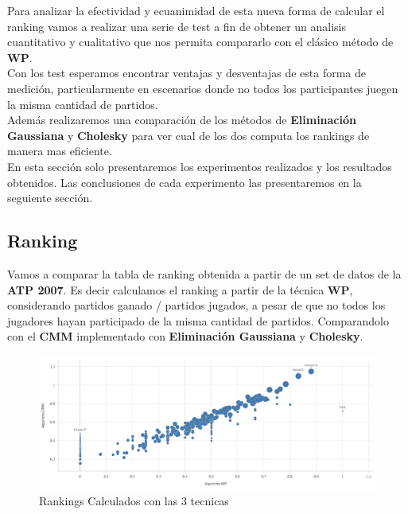 Para analizar la efectividad y ecuanimidad de esta nueva forma de calcular el ranking vamos a realizar una serie de test a fin de obtener un analisis cuantitativo y cualitativo que nos permita compararlo con el clásico método de \textbf{WP}. \\
Con los test esperamos encontrar ventajas y desventajas de esta forma de medición, particularmente en escenarios donde no todos los participantes juegen la misma cantidad de partidos.
\\

Además realizaremos una comparación de los métodos de \textbf{Eliminación Gaussiana} y \textbf{Cholesky} para ver cual de los dos computa los rankings de manera mas eficiente.
\\

En esta sección solo presentaremos los experimentos realizados y los resultados obtenidos. Las conclusiones de cada experimento
las presentaremos en la seguiente sección. 


\subsection{Ranking}

Vamos a comparar la tabla de ranking obtenida a partir de un set de datos de la \textbf{ATP 2007}. Es decir calculamos el ranking a partir de la técnica \textbf{WP}, considerando partidos ganado / partidos jugados, a pesar de que no todos los jugadores hayan participado de la misma cantidad de partidos. Comparandolo con el \textbf{CMM} implementado con \textbf{Eliminación Gaussiana} y \textbf{Cholesky}. \\


\begin{figure}[H]
\centering
\includegraphics[width=1\textwidth]{IMG/Comparativa WP- CMM todos.png}
\caption{Rankings Calculados con las 3 tecnicas}
\label{fig:Comparacion de tecnicas}
\end{figure}

\\

